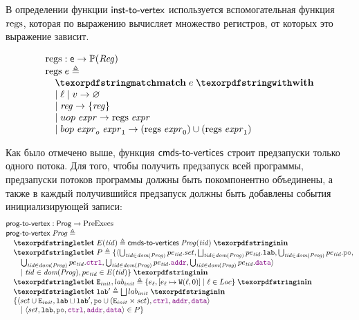 В определении функции $\textup{\sf inst-to-vertex}$ используется вспомогательная функция $\mathrm{regs}$, которая по выражению
вычисляет множество регистров, от которых это выражение зависит.

\[
\inarr{
  \regs : \Expr \rightarrow \Pset(\Reg) \\
  \regs \; e \defeq \\
  \quad \kw{match} \; e \; \kw{with} \\
  \quad | \; \loc \; | \; \val \rightarrow \emptyset \\
  \quad | \; \reg \rightarrow \{\reg\} \\
  \quad | \; uop \; \expr \rightarrow \regs \; \expr \\
  \quad | \; bop \; \expr_o \; \expr_1 \rightarrow (\regs \; \expr_0) \cup (\regs \; \expr_1) \\
}\]

Как было отмечено выше, функция $\textup{\sf cmds-to-vertices}$ строит предзапуски только одного потока.
Для того, чтобы получить предзапуск всей программы, предзапуски потоков программы должны быть покомпонентно
объединены, а также в каждый получившийся предзапуск должны быть добавлены события инициализирующей записи:
\[
\inarr{
{\textup{\sf prog-to-vertex}} : {\sf Prog} \rightarrow \PreExecutions \\
{\textup{\sf prog-to-vertex}} \; \Cfarm \defeq \\
\quad \letdef{E(\tId)}{\cmdsToVrtxs \; \Cfarm(\tId)} \\
\quad \kw{let} \; P \defeq
  \{\langle \bigcup_{\tId \in \dom{\Cfarm}} pe_{\tId}.set, \bigsqcup_{\tId \in \dom{\Cfarm}} pe_{\tId}.\lLAB,
    \bigcup_{\tId \in \dom{\Cfarm}} pe_{\tId}.\lPO, \\
\qquad 
    \bigcup_{\tId \in \dom{\Cfarm}} pe_{\tId}.\lCTRL, \bigcup_{\tId \in \dom{\Cfarm}} pe_{\tId}.\lADDR,
    \bigcup_{\tId \in \dom{\Cfarm}} pe_{\tId}.\lDATA \rangle \\
\qquad \mid \tId \in \dom{\Cfarm}, pe_{\tId} \in E(\tId) \} \;
\kw{in} \\
\quad \letdef{\lE_{init}, lab_{init}}{\{e_{\loc}, [e_{\loc} \mapsto \evlab{\lW}{\pln}{\loc}{0}] \mid \loc \in \Loc \}} \\
\quad \letdef{\lLAB'}{\bigsqcup lab_{init}} \\
\quad \{\tup{set \cup \lE_{init}, \lLAB \sqcup \lLAB', \lPO \cup (\lE_{init} \times set), \lCTRL, \lADDR, \lDATA} \\
\qquad \mid \tup{set, \lLAB, \lPO, \lCTRL, \lADDR, \lDATA} \in P\}
}\]


